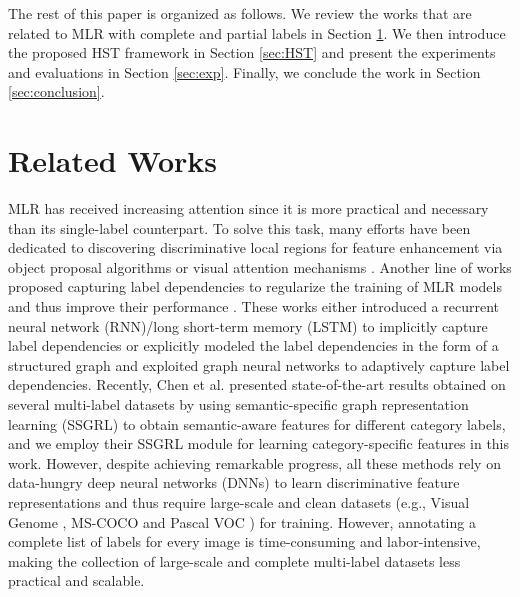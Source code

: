 The rest of this paper is organized as follows. We review the works that are related to MLR with complete and partial labels in Section \ref{sec:related_work}. We then introduce the proposed HST framework in Section \ref{sec:HST} and present the experiments and evaluations in Section \ref{sec:exp}. Finally, we conclude the work in Section \ref{sec:conclusion}.


\section{Related Works}
\label{sec:related_work}
MLR has received increasing attention \cite{wei2016hcp,yang2016exploit,chen2019multi,chen2019learning,nie2022multi,chen2022knowledge} since it is more practical and necessary than its single-label counterpart. To solve this task, many efforts have been dedicated to discovering discriminative local regions for feature enhancement via object proposal algorithms \cite{wei2016hcp,yang2016exploit} or visual attention mechanisms \cite{ba2014multiple,chen2018recurrent,wang2017multi}. Another line of works proposed capturing label dependencies to regularize the training of MLR models and thus improve their performance \cite{wang2016cnn,wang2017multi,chen2019multi,chen2019learning}. These works either introduced a recurrent neural network (RNN)/long short-term memory (LSTM) \cite{hochreiter1997long,liu2019contextualized} to implicitly capture label dependencies \cite{wang2016cnn,wang2017multi} or explicitly modeled the label dependencies in the form of a structured graph and exploited graph neural networks \cite{li2016gated,chen2021cross} to adaptively capture label dependencies. Recently, Chen et al. \cite{chen2019learning} presented state-of-the-art results obtained on several multi-label datasets by using semantic-specific graph representation learning (SSGRL) to obtain semantic-aware features for different category labels, and we employ their SSGRL module for learning category-specific features in this work. However, despite achieving remarkable progress, all these methods rely on data-hungry deep neural networks (DNNs) \cite{simonyan2015very,he2016deep} to learn discriminative feature representations and thus require large-scale and clean datasets (e.g., Visual Genome \cite{krishna2017visual}, MS-COCO \cite{lin2014microsoft} and Pascal VOC \cite{everingham2010pascal}) for training. However, annotating a complete list of labels for every image is time-consuming and labor-intensive, making the collection of large-scale and complete multi-label datasets less practical and scalable.

